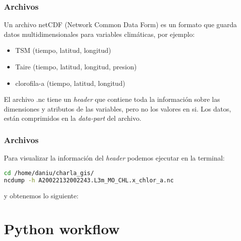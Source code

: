 \documentclass{beamer}
\begin{document}
\begin{frame}[fragile]
\frametitle{Archivos}

Un archivo netCDF (Network Common Data Form) es un formato que guarda datos multidimensionales para variables climáticas, por ejemplo:

\begin{itemize}
	
	\item TSM (tiempo, latitud, longitud)
	\item Taire (tiempo, latitud, longitud, presion)
	\item clorofila-a (tiempo, latitud, longitud)
	
\end{itemize}

\pause

El archivo .nc tiene un \textit{header} que contiene toda la información sobre las dimensiones y atributos de las variables, pero no los valores en si. Los datos, están comprimidos en la \textit{data-part} del archivo. 

\end{frame}


\begin{frame}[fragile]
\frametitle{Archivos}

Para visualizar la información del \textit{header} podemos ejecutar en la terminal:

\begin{lstlisting}[language=bash, basicstyle=\scriptsize]
cd /home/daniu/charla_gis/
ncdump -h A20022132002243.L3m_MO_CHL.x_chlor_a.nc
\end{lstlisting}

y obtenemos lo siguiente:

\begin{figure}


\end{figure}

\end{frame}

\section{Python workflow}
\end{document}
